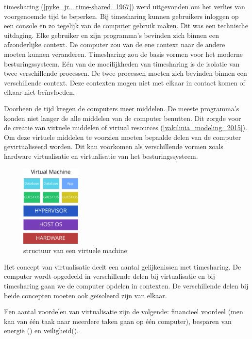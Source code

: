 \documentclass[pdftex,a4paper,12pt,twoside]{report}
\begin{document}
timesharing (\ref{pyke_jr._time-shared_1967}) werd uitgevonden om het verlies van voorgenoemde tijd te beperken. Bij timesharing kunnen gebruikers inloggen op een console en zo tegelijk van de computer gebruik maken. Dit was een technische uitdaging. Elke gebruiker en zijn programma's bevinden zich binnen een afzonderlijke context. De computer zou van de ene context naar de andere moeten kunnen veranderen. Timesharing zou de basis vormen voor het moderne besturingssysteem. Eén van de moeilijkheden van timesharing is de isolatie van twee verschillende processen. De twee processen moeten zich bevinden binnen een verschillende context. Deze contexten mogen niet met elkaar in contact komen of elkaar niet beïnvloeden.

Doorheen de tijd kregen de computers meer middelen. De meeste programma's konden niet langer de alle middelen van de computer benutten. Dit zorgde voor de creatie van virtuele middelen of virtual resources (\ref{vakilinia_modeling_2015}). Om deze virtuele middelen te voorzien moeten bepaalde delen van de computer gevirtualiseerd worden. Dit kan voorkomen als verschillende vormen zoals hardware virtualisatie en virtualisatie van het besturingssysteem.

\begin{figure}
    \centering
    \includegraphics[width=3cm]{img/virtual-machine}
    \caption{structuur van een virtuele machine}
    \label{fig:virtualmachine}
\end{figure}

Het concept van virtualisatie deelt een aantal gelijkenissen met timesharing. De computer wordt opgedeeld in verschillende delen bij virtualisatie en bij timesharing gaan we de computer opdelen in contexten. De verschillende delen bij beide concepten moeten ook geïsoleerd zijn van elkaar.

Een aantal voordelen van virtualisatie zijn de volgende: financieel voordeel (men kan van één taak naar meerdere taken gaan op één computer), besparen van energie (\cite{beloglazov_energy_2010}) en veiligheid(\cite{mortleman_security_2009}).
\end{document}
